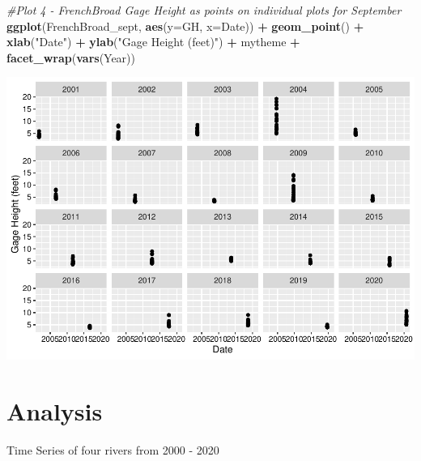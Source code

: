 \documentclass[12pt,]{article}
\newenvironment{Shaded}{\begin{snugshade}}{\end{snugshade}}
\newcommand{\CommentTok}[1]{\textcolor[rgb]{0.56,0.35,0.01}{\textit{#1}}}
\newcommand{\DataTypeTok}[1]{\textcolor[rgb]{0.13,0.29,0.53}{#1}}
\newcommand{\KeywordTok}[1]{\textcolor[rgb]{0.13,0.29,0.53}{\textbf{#1}}}
\newcommand{\NormalTok}[1]{#1}
\newcommand{\OperatorTok}[1]{\textcolor[rgb]{0.81,0.36,0.00}{\textbf{#1}}}
\newcommand{\StringTok}[1]{\textcolor[rgb]{0.31,0.60,0.02}{#1}}
\begin{document}
\begin{Shaded}
\begin{Highlighting}[]
\CommentTok{#Plot 4 - FrenchBroad Gage Height as points on individual plots for September}
\KeywordTok{ggplot}\NormalTok{(FrenchBroad_sept, }\KeywordTok{aes}\NormalTok{(}\DataTypeTok{y=}\NormalTok{GH, }\DataTypeTok{x=}\NormalTok{Date)) }\OperatorTok{+}
\StringTok{  }\KeywordTok{geom_point}\NormalTok{() }\OperatorTok{+}
\StringTok{  }\KeywordTok{xlab}\NormalTok{(}\StringTok{"Date"}\NormalTok{) }\OperatorTok{+}
\StringTok{  }\KeywordTok{ylab}\NormalTok{(}\StringTok{"Gage Height (feet)"}\NormalTok{) }\OperatorTok{+}
\StringTok{  }\NormalTok{mytheme }\OperatorTok{+}
\StringTok{  }\KeywordTok{facet_wrap}\NormalTok{(}\KeywordTok{vars}\NormalTok{(Year)) }
\end{Highlighting}
\end{Shaded}

\includegraphics{Project_Template_files/figure-latex/Plots-4.pdf}

\newpage

\hypertarget{analysis}{%
\section{Analysis}\label{analysis}}

Time Series of four rivers from 2000 - 2020
\end{document}
